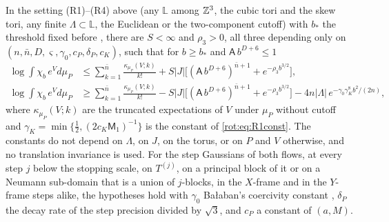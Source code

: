\begin{theorem}\label{rot:thm:R1}
In the setting \textup{(R1)}--\textup{(R4)} above (any $\mathbb{L}$ among $\mathbb Z^3$, the cubic tori and the skew tori, any finite $\Lambda\subset\mathbb{L}$, the Euclidean or the two-component cutoff) with $b_*$ the threshold fixed before , there are $S<\infty$ and $\rho_3>0$, all three depending only on $(n,\bar n,D,\varsigma,\gamma_0,c_P,\delta_P,c_K)$, such that for $b\ge b_*$ and $\mathsf A\,b^{D+6}\le1$
\begin{align*}
\log\int\chi_b\,e^{V}d\mu_P&\le\sum_{k=1}^{\bar n}\frac{\kappa_{\mu_P}(V;k)}{k!}+S|J|\big[(\mathsf A\,b^{D+6})^{\bar n+1}+e^{-\rho_3b^{3/2}}\big],\\
\log\int\chi_b\,e^{V}d\mu_P&\ge\sum_{k=1}^{\bar n}\frac{\kappa_{\mu_P}(V;k)}{k!}-S|J|\big[(\mathsf A\,b^{D+6})^{\bar n+1}+e^{-\rho_3b^{3/2}}\big]-4n|\Lambda|\,e^{-\gamma_0\gamma_K^{8}b^2/(2n)},
\end{align*}
where $\kappa_{\mu_P}(V;k)$ are the truncated expectations of $V$ under $\mu_P$ without cutoff and $\gamma_K=\min\{\frac12,(2c_K\mathsf M_1)^{-1}\}$ is the constant of \eqref{rot:eq:R1const}. The constants do not depend on $\Lambda$, on $J$, on the torus, or on $P$ and $V$ otherwise, and no translation invariance is used. For the step Gaussians of both flows, at every step $j$ below the stopping scale, on $T^{(j)}$, on a principal block of it or on a Neumann sub-domain that is a union of $j$-blocks, in the $X$-frame and in the $Y$-frame steps alike, the hypotheses hold with $\gamma_0$ Ba{\l}aban's coercivity constant \cite[(2.33)]{Ba1}, $\delta_P$ the decay rate of the step precision divided by $\sqrt3$, and $c_P$ a constant of $(a,M)$.
\end{theorem}
